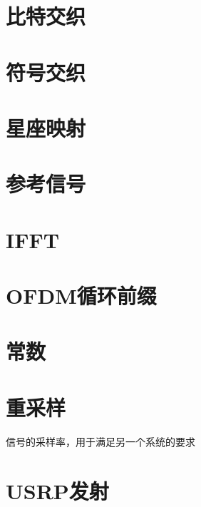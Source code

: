 	\section{比特交织}
	\section{符号交织}
	\section{星座映射}
	\section{参考信号}
	\section{IFFT}
	\section{OFDM循环前缀}
	\section{常数}
	\section{重采样}
		\par 信号的采样率，用于满足另一个系统的要求
	\section{USRP发射}
